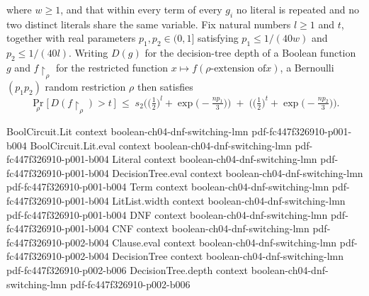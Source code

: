 \begin{theorem}
where $w \ge 1$, and that within every term of every $g_i$ no literal is repeated and no
two distinct literals share the same variable. Fix natural numbers $l \ge 1$ and $t$,
together with real parameters $p_1, p_2 \in (0,1]$ satisfying $p_1 \le 1/(40w)$ and $p_2
\le 1/(40l)$. Writing $D(g)$ for the decision-tree depth of a Boolean function $g$ and
$f\restriction_\rho$ for the restricted function $x \mapsto f(\rho\text{-extension of
}x)$, a Bernoulli$(p_1 p_2)$ random restriction $\rho$ then satisfies
\[
  \Pr_{\rho}\!\big[\, D(f\restriction_\rho) > t \,\big]
  \;\le\;
  s_2\Big( \big(\tfrac12\big)^{l} + \exp\!\big(-\tfrac{n p_1}{3}\big) \Big)
  \;+\;
  \Big( \big(\tfrac12\big)^{t} + \exp\!\big(-\tfrac{n p_2}{3}\big) \Big).
\]
\end{theorem}

\begin{lemma}
\label{LMN.circuit_reduction_depth3}
\leanok
{}
\proofstep
  {BoolCircuit.Lit}
  {context}
  {boolean-ch04-dnf-switching-lmn}
  {pdf-fc447f326910-p001-b004}
\proofstep
  {BoolCircuit.Lit.eval}
  {context}
  {boolean-ch04-dnf-switching-lmn}
  {pdf-fc447f326910-p001-b004}
\proofstep
  {Literal}
  {context}
  {boolean-ch04-dnf-switching-lmn}
  {pdf-fc447f326910-p001-b004}
\proofstep
  {DecisionTree.eval}
  {context}
  {boolean-ch04-dnf-switching-lmn}
  {pdf-fc447f326910-p001-b004}
\proofstep
  {Term}
  {context}
  {boolean-ch04-dnf-switching-lmn}
  {pdf-fc447f326910-p001-b004}
\proofstep
  {LitList.width}
  {context}
  {boolean-ch04-dnf-switching-lmn}
  {pdf-fc447f326910-p001-b004}
\proofstep
  {DNF}
  {context}
  {boolean-ch04-dnf-switching-lmn}
  {pdf-fc447f326910-p001-b004}
\proofstep
  {CNF}
  {context}
  {boolean-ch04-dnf-switching-lmn}
  {pdf-fc447f326910-p002-b004}
\proofstep
  {Clause.eval}
  {context}
  {boolean-ch04-dnf-switching-lmn}
  {pdf-fc447f326910-p002-b004}
\proofstep
  {DecisionTree}
  {context}
  {boolean-ch04-dnf-switching-lmn}
  {pdf-fc447f326910-p002-b006}
\proofstep
  {DecisionTree.depth}
  {context}
  {boolean-ch04-dnf-switching-lmn}
  {pdf-fc447f326910-p002-b006}

\end{lemma}
